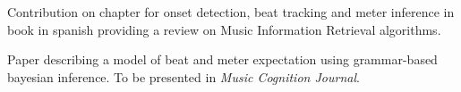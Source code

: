 
%


\begin{cvpubs}
\small \color{black}
{Contribution on chapter for onset detection, beat tracking and meter inference
  in book in spanish providing a review on Music
  Information Retrieval algorithms. 
}

{Paper describing a model of beat and meter expectation using grammar-based
  bayesian inference.
To be presented in \emph{Music Cognition Journal}.
}

\end{cvpubs}

